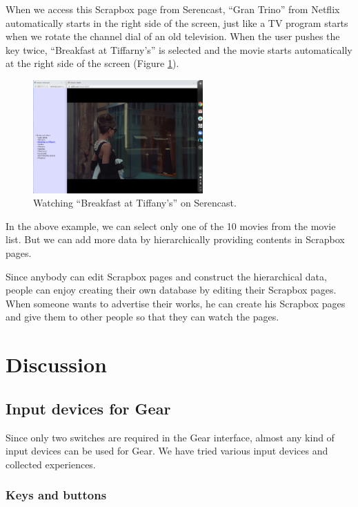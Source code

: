 \documentclass[conference]{IEEEtran}
\def\down{\tsf{▼}}
\def\SC{Serencast}
\def\SB{Scrapbox}
\begin{document}
When we access this {\SB} page from {\SC},
``Gran Trino'' from Netflix automatically starts in the right side of the screen,
just like a TV program starts when we rotate the channel dial of an old television.
When the user pushes the {\down} key twice,
``Breakfast at Tiffarny's'' is selected and
the movie starts automatically at the right side of the screen (Figure \ref{tiffany}).

\begin{figure}[H]
  \centerline{\includegraphics[width=65mm,bb=0 0 2400 1600]{figures/e8ae562a5a68a1955ac70b4faed9a146.png}}
  \caption{Watching ``Breakfast at Tiffany's'' on Serencast.}
  \label{tiffany}
\end{figure}


In the above example, we can select only one of the 10 movies from the movie list.
But we can add more data by hierarchically providing contents in {\SB} pages.

Since anybody can edit {\SB} pages and construct the hierarchical data,
people can enjoy creating their own database by editing their {\SB} pages.
When someone wants to advertise their works,
he can create his {\SB} pages
and give them to other people so that they can watch the pages.

\section{Discussion}

\subsection{Input devices for Gear}

Since only two switches are required in the Gear interface,
almost any kind of input devices can be used for Gear.
We have tried various input devices and collected experiences.

\subsubsection{Keys and buttons}
\end{document}
